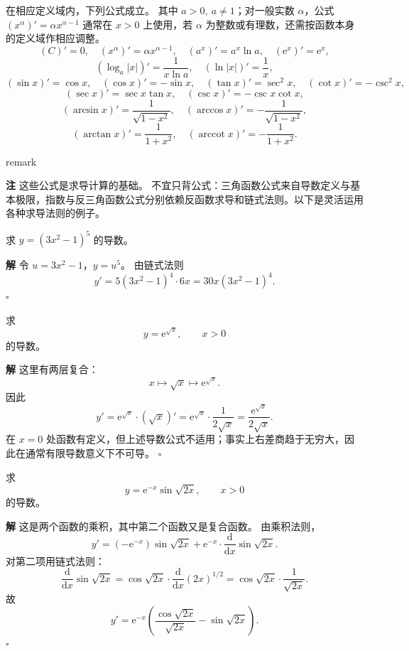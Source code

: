 \documentclass[fontset=fandol]{ctexart}
\newenvironment{solution}{\par\noindent\textbf{解}\quad}{\hfill$\square$\par\vspace{0.8em}}
\newenvironment{remark}{\par\noindent\textbf{注}\quad}{\par\vspace{0.8em}}
\newcommand{\dd}{\mathrm{d}}
\newcommand{\ee}{\mathrm{e}}
\begin{document}
\begin{proposition}[常用基本导数公式]
	在相应定义域内，下列公式成立。 其中 $a>0,\ a\neq1$；对一般实数 $\alpha$，公式 $(x^\alpha)'=\alpha x^{\alpha-1}$ 通常在 $x>0$ 上使用，若 $\alpha$ 为整数或有理数，还需按函数本身的定义域作相应调整。
	\[
	(C)'=0,\quad (x^\alpha)'=\alpha x^{\alpha-1},\quad (a^x)'=a^x\ln a,\quad (\ee^x)'=\ee^x,
	\]
	\[
	(\log_a |x|)'=\frac1{x\ln a},\quad (\ln |x|)'=\frac1x,
	\]
	\[
	(\sin x)'=\cos x,\quad (\cos x)'=-\sin x,\quad
	(\tan x)'=\sec^2x,\quad (\cot x)'=-\csc^2x,
	\]
	\[
	(\sec x)'=\sec x\tan x,\quad (\csc x)'=-\csc x\cot x,
	\]
	\[
	(\arcsin x)'=\frac1{\sqrt{1-x^2}},\quad
	(\arccos x)'=-\frac1{\sqrt{1-x^2}},
	\]
	\[
	(\arctan x)'=\frac1{1+x^2},\quad
	(\operatorname{arccot}x)'=-\frac1{1+x^2}.
	\]
\end{proposition}remark
\begin{remark}
	这些公式是求导计算的基础。 不宜只背公式：三角函数公式来自导数定义与基本极限，指数与反三角函数公式分别依赖反函数求导和链式法则。以下是灵活运用各种求导法则的例子。
\end{remark}


\begin{example}[公式求导]
	求 $y=(3x^2-1)^5$ 的导数。
\end{example}
\begin{solution}
	令 $u=3x^2-1$，$y=u^5$。 由链式法则
	\[
	y'=5(3x^2-1)^4\cdot6x=30x(3x^2-1)^4.
	\]
\end{solution}

\begin{example}[多层复合求导]
	求
	\[
	y=\ee^{\sqrt{x}},\qquad x>0
	\]
	的导数。
\end{example}
\begin{solution}
	这里有两层复合：
	\[
	x\longmapsto \sqrt{x}\longmapsto \ee^{\sqrt{x}}.
	\]
	因此
	\[
	y'=\ee^{\sqrt{x}}\cdot(\sqrt{x})'
	=\ee^{\sqrt{x}}\cdot\frac{1}{2\sqrt{x}}
	=\frac{\ee^{\sqrt{x}}}{2\sqrt{x}}.
	\]
	在 $x=0$ 处函数有定义，但上述导数公式不适用；事实上右差商趋于无穷大，因此在通常有限导数意义下不可导。
\end{solution}

\begin{example}[复合与乘积同时出现]
	求
	\[
	y=\ee^{-x}\sin\sqrt{2x},\qquad x>0
	\]
	的导数。
\end{example}
\begin{solution}
	这是两个函数的乘积，其中第二个函数又是复合函数。 由乘积法则，
	\[
	y'=(-\ee^{-x})\sin\sqrt{2x}
	+\ee^{-x}\cdot\frac{\dd}{\dd x}\sin\sqrt{2x}.
	\]
	对第二项用链式法则：
	\[
	\frac{\dd}{\dd x}\sin\sqrt{2x}
	=\cos\sqrt{2x}\cdot\frac{\dd}{\dd x}(2x)^{1/2}
	=\cos\sqrt{2x}\cdot\frac1{\sqrt{2x}}.
	\]
	故
	\[
	y'=\ee^{-x}\left(\frac{\cos\sqrt{2x}}{\sqrt{2x}}-\sin\sqrt{2x}\right).
	\]
\end{solution}
\end{document}

